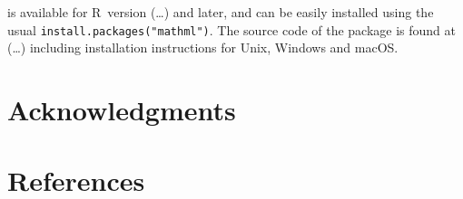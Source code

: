  is available for R~version (\ldots) and later, and can be easily installed using the usual \texttt{install.packages("mathml")}. The source code of the package is found at (\ldots) including installation instructions for Unix, Windows and macOS.

\hypertarget{acknowledgments}{%
\section{Acknowledgments}\label{acknowledgments}}

\hypertarget{references}{%
\section*{References}\label{references}}

